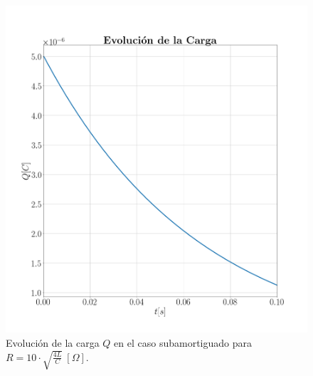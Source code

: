 \documentclass[journal]{IEEEtran}
\begin{document}
\begin{figure}[!htb]
    \centering
    \includegraphics[width=\linewidth,trim={70 70 70 70},clip]{cargasobreamortiguado.png}
    \caption{Evolución de la carga $Q$ en el caso subamortiguado para $R=10 \cdot\sqrt{\frac{4L}{C}}~[\Omega]$.}
    \label{fig:cargaamortiguado}
\end{figure}
\end{document}
